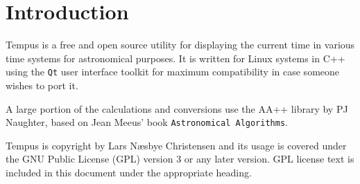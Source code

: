 \section{Introduction}
Tempus is a free and open source utility for displaying the current time in various time systems for astronomical purposes. It is written for Linux systems in C++ using the \texttt{Qt} user interface toolkit for maximum compatibility in case someone wishes to port it.

A large portion of the calculations and conversions use the AA++ library by PJ Naughter, based on Jean Meeus' book \texttt{Astronomical Algorithms}.

Tempus is copyright by Lars N{\ae}sbye Christensen and its usage is covered under the GNU Public License (GPL) version 3 or any later version. GPL license text is included in this document under the appropriate heading.

